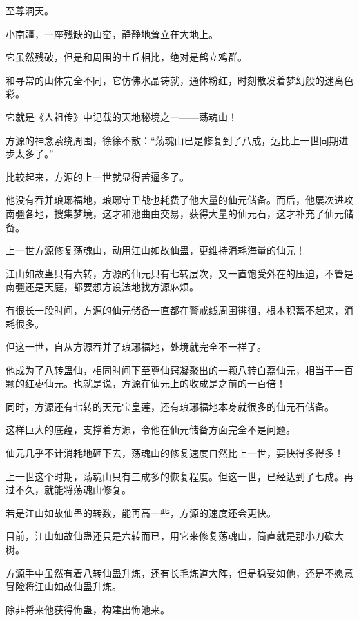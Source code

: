 
\begin{this_body}

至尊洞天。

小南疆，一座残缺的山峦，静静地耸立在大地上。

它虽然残破，但是和周围的土丘相比，绝对是鹤立鸡群。

和寻常的山体完全不同，它仿佛水晶铸就，通体粉红，时刻散发着梦幻般的迷离色彩。

它就是《人祖传》中记载的天地秘境之一——荡魂山！

方源的神念萦绕周围，徐徐不散：“荡魂山已是修复到了八成，远比上一世同期进步太多了。”

比较起来，方源的上一世就显得苦逼多了。

他没有吞并琅琊福地，琅琊守卫战也耗费了他大量的仙元储备。而后，他屡次进攻南疆各地，搜集梦境，这才和池曲由交易，获得大量的仙元石，这才补充了仙元储备。

上一世方源修复荡魂山，动用江山如故仙蛊，更维持消耗海量的仙元！

江山如故蛊只有六转，方源的仙元只有七转层次，又一直饱受外在的压迫，不管是南疆还是天庭，都要想方设法地找方源麻烦。

有很长一段时间，方源的仙元储备一直都在警戒线周围徘徊，根本积蓄不起来，消耗很多。

但这一世，自从方源吞并了琅琊福地，处境就完全不一样了。

他成为了八转蛊仙，相同时间下至尊仙窍凝聚出的一颗八转白荔仙元，相当于一百颗的红枣仙元。也就是说，方源在仙元上的收成是之前的一百倍！

同时，方源还有七转的天元宝皇莲，还有琅琊福地本身就很多的仙元石储备。

这样巨大的底蕴，支撑着方源，令他在仙元储备方面完全不是问题。

仙元几乎不计消耗地砸下去，荡魂山的修复速度自然比上一世，要快得多得多！

上一世这个时期，荡魂山只有三成多的恢复程度。但这一世，已经达到了七成。再过不久，就能将荡魂山修复。

若是江山如故仙蛊的转数，能再高一些，方源的速度还会更快。

目前，江山如故仙蛊还只是六转而已，用它来修复荡魂山，简直就是那小刀砍大树。

方源手中虽然有着八转仙蛊升炼，还有长毛炼道大阵，但是稳妥如他，还是不愿意冒险将江山如故仙蛊升炼。

除非将来他获得悔蛊，构建出悔池来。


\end{this_body}
